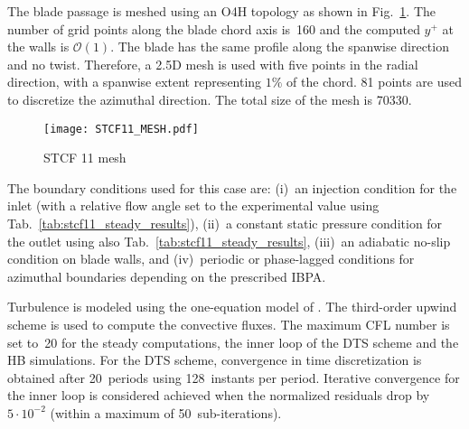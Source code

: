 
The blade passage is meshed using an O4H 
topology as shown in Fig.~\ref{fig:stcf11_mesh}.
The number of grid points along the blade
chord axis is~160 and the computed $y^+$ at the walls is $\mathcal{O}(1)$.
The blade has the same profile along the spanwise direction and no
twist. Therefore, a 2.5D mesh is used with five points 
in the radial direction, with a spanwise
extent representing $1\%$ of the chord. 
81 points are used to discretize the azimuthal direction.
The total size of the mesh is 70330.
\begin{figure}[htb]
  \centering
  \texttt{[image: STCF11\_MESH.pdf]}
  \caption{STCF 11 mesh}
  \label{fig:stcf11_mesh}
\end{figure}

The boundary conditions used for this case are: (i)~an
injection condition  for the inlet (with a relative flow angle
set to the  experimental value using Tab.~\ref{tab:stcf11_steady_results}), 
(ii)~a constant static pressure
condition for the outlet using also Tab.~\ref{tab:stcf11_steady_results},  
(iii)~an adiabatic no-slip condition on
blade walls, and (iv)~periodic or phase-lagged conditions 
for azimuthal boundaries depending on the  
prescribed IBPA.

Turbulence is modeled using the one-equation model of
\citet{Spalart1992}.  The third-order upwind \citet{Roe1981}
scheme is used to compute the convective fluxes.
The maximum
CFL number is set to~20 for the steady computations,  the inner loop
of the DTS scheme and the HB simulations.  For the DTS scheme,  
convergence in time discretization is obtained
after 20~periods using 128~instants per period.  Iterative convergence 
for the inner loop is considered achieved when the normalized
residuals drop by $5\cdot 10^{-2}$ (within a maximum of
50~sub-iterations).

